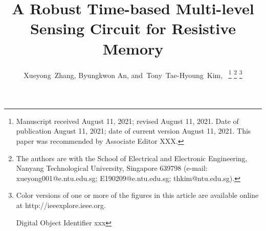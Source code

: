 \title{A Robust Time-based Multi-level Sensing Circuit for Resistive Memory}


\author{
        Xueyong~Zhang, Byungkwon An,
        and~Tony~Tae-Hyoung~Kim,~%
\thanks{
Manuscript received August 11, 2021; revised August 11, 2021. Date of publication August 11, 2021; date of current version August 11, 2021. This paper was recommended by Associate Editor XXX. 
}%
\thanks{
The authors are with the School of Electrical and Electronic Engineering, Nanyang Technological University, Singapore 639798 (e-mail: xueyong001@e.ntu.edu.sg; E190209@e.ntu.edu.sg; thkim@ntu.edu.sg).
}%
\thanks{
Color versions of one or more of the figures in this article are available online at http://ieeexplore.ieee.org. \par
Digital Object Identifier xxx
}
}
